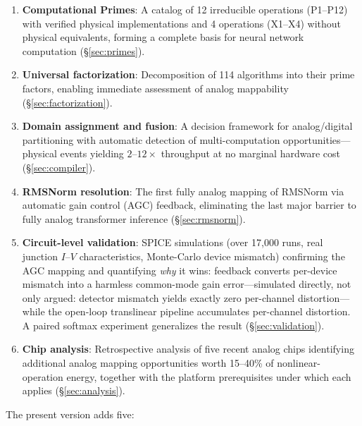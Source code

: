 \documentclass[11pt]{article}
\begin{document}
\begin{enumerate}[leftmargin=*]
\item \textbf{Computational Primes}: A catalog of 12 irreducible operations (P1--P12) with verified physical implementations and 4 operations (X1--X4) without physical equivalents, forming a complete basis for neural network computation (\S\ref{sec:primes}).

\item \textbf{Universal factorization}: Decomposition of 114 algorithms into their prime factors, enabling immediate assessment of analog mappability (\S\ref{sec:factorization}).

\item \textbf{Domain assignment and fusion}: A decision framework for analog/digital partitioning with automatic detection of multi-computation opportunities---physical events yielding $2$--$12\times$ throughput at no marginal hardware cost (\S\ref{sec:compiler}).

\item \textbf{RMSNorm resolution}: The first fully analog mapping of RMSNorm via automatic gain control (AGC) feedback, eliminating the last major barrier to fully analog transformer inference (\S\ref{sec:rmsnorm}).

\item \textbf{Circuit-level validation}: SPICE simulations (over 17{,}000 runs, real junction $I$--$V$ characteristics, Monte-Carlo device mismatch) confirming the AGC mapping and quantifying \textit{why} it wins: feedback converts per-device mismatch into a harmless common-mode gain error---simulated directly, not only argued: detector mismatch yields exactly zero per-channel distortion---while the open-loop translinear pipeline accumulates per-channel distortion. A paired softmax experiment generalizes the result (\S\ref{sec:validation}).

\item \textbf{Chip analysis}: Retrospective analysis of five recent analog chips identifying additional analog mapping opportunities worth 15--40\% of nonlinear-operation energy, together with the platform prerequisites under which each applies (\S\ref{sec:analysis}).
\end{enumerate}

\noindent The present version adds five:
\end{document}
